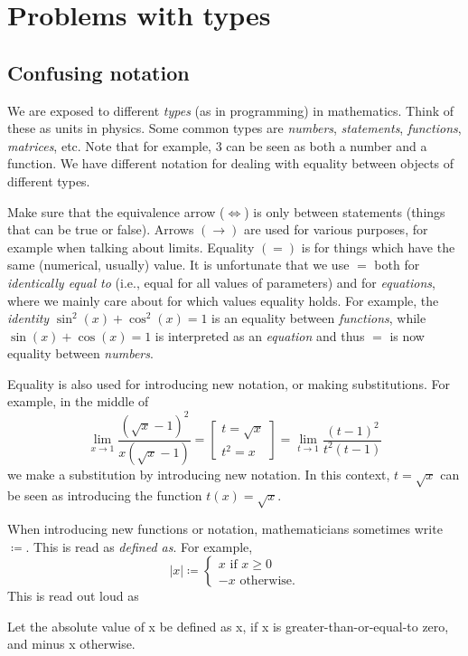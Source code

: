 \section[mistakesType]{Problems with types}

\subsection[mistakesTypesIntro]{Confusing notation}

We are exposed to different \emph{types} (as in programming) in mathematics.
Think of these as units in physics.
Some common types are \emph{numbers}, \emph{statements}, \emph{functions},
\emph{matrices}, etc.
Note that for example, $3$ can be seen as both a number and a function.
We have different notation for dealing with equality between objects of different types.

Make sure that the equivalence arrow ($\iff$) is only between statements
(things that can be true or false).
Arrows $(\to)$ are used for various purposes, for example when talking about limits.
Equality $(=)$ is for things which have the same (numerical, usually) value.
It is unfortunate that we use $=$ both for \emph{identically equal to}
(i.e., equal for all values of parameters) and for \emph{equations}, where we
mainly care about for which values equality holds.
For example, the \emph{identity} $\sin^2(x)+\cos^2(x)=1$ is an equality between
\emph{functions}, while $\sin(x)+\cos(x)=1$ is interpreted as an
\emph{equation} and thus $=$ is now equality between \emph{numbers}.


Equality is also used for introducing new notation, or making substitutions.
For example, in the middle of
\[
\lim_{x\to 1} \frac{(\sqrt{x}-1)^2}{x(\sqrt{x}-1)} =
\left[
\begin{smallmatrix}
t = \sqrt{x} \\
t^2 = x
\end{smallmatrix}
\right] =
\lim_{t\to 1} \frac{(t-1)^2}{t^2(t-1)}
\]
we make a substitution by introducing new notation.  In this context,
$t = \sqrt{x}$
can be seen as introducing the function $t(x) = \sqrt{x}$.

When introducing new functions or notation, mathematicians sometimes write $\coloneqq$.
This is read as \emph{defined as}. For example,
\[
|x| \coloneqq
\begin{cases}
x \text{ if } x\geq 0 \\
-x \text{ otherwise}.
\end{cases}
\]
This is read out loud as
\begin{blockquote}
Let the absolute value of x be defined as x, if x is greater-than-or-equal-to zero,
and minus x otherwise.
\end{blockquote}


